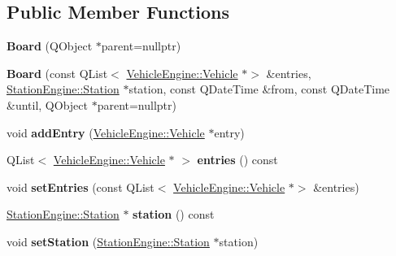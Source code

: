 \subsection*{Public Member Functions}
\begin{DoxyCompactItemize}
\item 
\mbox{\label{classLiveboardEngine_1_1Board_a70370a5f86db87e9edb9ca23de58b38b}} 
{\bfseries Board} (Q\+Object $\ast$parent=nullptr)
\item 
\mbox{\label{classLiveboardEngine_1_1Board_ae1f97006ef5590a3b4c6b27f48c83c1f}} 
{\bfseries Board} (const Q\+List$<$ \mbox{\hyperlink{classVehicleEngine_1_1Vehicle}{Vehicle\+Engine\+::\+Vehicle}} $\ast$$>$ \&entries, \mbox{\hyperlink{classStationEngine_1_1Station}{Station\+Engine\+::\+Station}} $\ast$station, const Q\+Date\+Time \&from, const Q\+Date\+Time \&until, Q\+Object $\ast$parent=nullptr)
\item 
\mbox{\label{classLiveboardEngine_1_1Board_abda2c74a02ab090986147ef538337645}} 
void {\bfseries add\+Entry} (\mbox{\hyperlink{classVehicleEngine_1_1Vehicle}{Vehicle\+Engine\+::\+Vehicle}} $\ast$entry)
\item 
\mbox{\label{classLiveboardEngine_1_1Board_a73fd7f8c8ff5f69da644ed20798059d1}} 
Q\+List$<$ \mbox{\hyperlink{classVehicleEngine_1_1Vehicle}{Vehicle\+Engine\+::\+Vehicle}} $\ast$ $>$ {\bfseries entries} () const
\item 
\mbox{\label{classLiveboardEngine_1_1Board_a35d5d7a4b24e0f051d1e53ce7bb94761}} 
void {\bfseries set\+Entries} (const Q\+List$<$ \mbox{\hyperlink{classVehicleEngine_1_1Vehicle}{Vehicle\+Engine\+::\+Vehicle}} $\ast$$>$ \&entries)
\item 
\mbox{\label{classLiveboardEngine_1_1Board_a1f477aa1637a52fdaff701cb4897c3f0}} 
\mbox{\hyperlink{classStationEngine_1_1Station}{Station\+Engine\+::\+Station}} $\ast$ {\bfseries station} () const
\item 
\mbox{\label{classLiveboardEngine_1_1Board_aa68cbd2bec552af0227238b592e7c048}} 
void {\bfseries set\+Station} (\mbox{\hyperlink{classStationEngine_1_1Station}{Station\+Engine\+::\+Station}} $\ast$station)

\end{DoxyCompactItemize}
